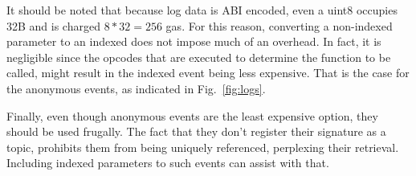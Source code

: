 \begin{table}[]
\caption{Structure of events and logs included in the experiments}
\centering
\label{table:event}
\end{table}

It should be noted that because log data is ABI encoded, even a uint8 occupies 32B and is charged \( 8*32 = 256 \) gas. For this reason, converting a non-indexed parameter to an indexed does not impose much of an overhead. In fact, it is negligible since the opcodes that are executed to determine the function to be called, might result in the indexed event being less expensive. That is the case for the anonymous events, as indicated in Fig.~\ref{fig:logs}.

Finally, even though anonymous events are the least expensive option, they should be used frugally. The fact that they don’t register their signature as a topic, prohibits them from being uniquely referenced, perplexing their retrieval. Including indexed parameters to such events can assist with that.

